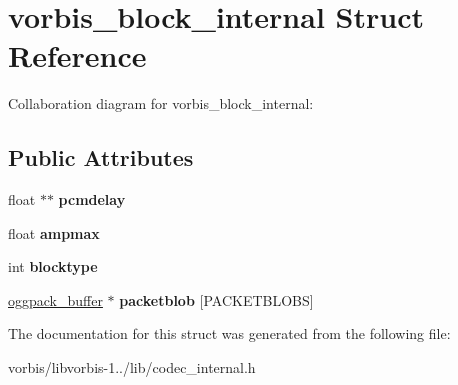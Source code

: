 \hypertarget{structvorbis__block__internal}{\section{vorbis\+\_\+block\+\_\+internal Struct Reference}
\label{structvorbis__block__internal}
}


Collaboration diagram for vorbis\+\_\+block\+\_\+internal\+:
\subsection*{Public Attributes}
\begin{DoxyCompactItemize}
\item 
\hypertarget{structvorbis__block__internal_a6a650f039d0b3c0b320c8bf5e198547a}{float $\ast$$\ast$ {\bfseries pcmdelay}}\label{structvorbis__block__internal_a6a650f039d0b3c0b320c8bf5e198547a}

\item 
\hypertarget{structvorbis__block__internal_ad06b07115317a4928f8807c61a903da9}{float {\bfseries ampmax}}\label{structvorbis__block__internal_ad06b07115317a4928f8807c61a903da9}

\item 
\hypertarget{structvorbis__block__internal_a4e3ca80a917072fbbe17dd5bd23f96ed}{int {\bfseries blocktype}}\label{structvorbis__block__internal_a4e3ca80a917072fbbe17dd5bd23f96ed}

\item 
\hypertarget{structvorbis__block__internal_a7b98d48f2d7a3305005d0513a7698218}{\hyperlink{structoggpack__buffer}{oggpack\+\_\+buffer} $\ast$ {\bfseries packetblob} \mbox{[}P\+A\+C\+K\+E\+T\+B\+L\+O\+B\+S\mbox{]}}\label{structvorbis__block__internal_a7b98d48f2d7a3305005d0513a7698218}

\end{DoxyCompactItemize}


The documentation for this struct was generated from the following file\+:\begin{DoxyCompactItemize}
\item 
vorbis/libvorbis-\/1../lib/codec\+\_\+internal.\+h\end{DoxyCompactItemize}
